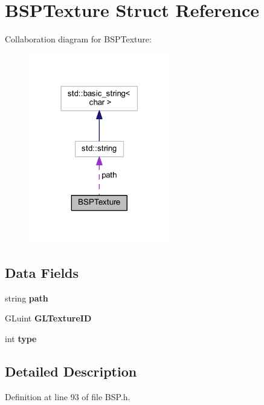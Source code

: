\hypertarget{struct_b_s_p_texture}{}\section{B\+S\+P\+Texture Struct Reference}
\label{struct_b_s_p_texture}


Collaboration diagram for B\+S\+P\+Texture\+:
\nopagebreak
\begin{figure}[H]
\begin{center}
\leavevmode
\includegraphics[width=175pt]{struct_b_s_p_texture__coll__graph}
\end{center}
\end{figure}
\subsection*{Data Fields}
\begin{DoxyCompactItemize}
\item 
string {\bfseries path}\hypertarget{struct_b_s_p_texture_a6224e57403bbc640af1d4bb0d0f1a15a}{}\label{struct_b_s_p_texture_a6224e57403bbc640af1d4bb0d0f1a15a}

\item 
G\+Luint {\bfseries G\+L\+Texture\+ID}\hypertarget{struct_b_s_p_texture_aa267445bc116004d7cd7196e0b01e567}{}\label{struct_b_s_p_texture_aa267445bc116004d7cd7196e0b01e567}

\item 
int {\bfseries type}\hypertarget{struct_b_s_p_texture_a2617bf848d7df3492c45341e474fff5e}{}\label{struct_b_s_p_texture_a2617bf848d7df3492c45341e474fff5e}

\end{DoxyCompactItemize}


\subsection{Detailed Description}


Definition at line 93 of file B\+S\+P.\+h.

